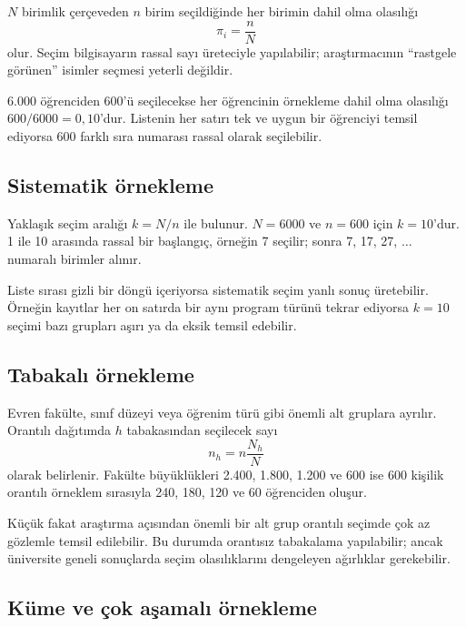 $N$ birimlik çerçeveden $n$ birim seçildiğinde her birimin dahil olma
olasılığı
\[
\pi_i=\frac{n}{N}
\]
olur. Seçim bilgisayarın rassal sayı üreteciyle yapılabilir; araştırmacının
``rastgele görünen'' isimler seçmesi yeterli değildir.

\begin{ornek}
6.000 öğrenciden 600'ü seçilecekse her öğrencinin örnekleme dahil olma
olasılığı $600/6000=0{,}10$'dur. Listenin her satırı tek ve uygun bir öğrenciyi
temsil ediyorsa 600 farklı sıra numarası rassal olarak seçilebilir.
\end{ornek}

\subsection{Sistematik örnekleme}

Yaklaşık seçim aralığı $k=N/n$ ile bulunur. $N=6000$ ve $n=600$ için
$k=10$'dur. 1 ile 10 arasında rassal bir başlangıç, örneğin 7 seçilir; sonra
7, 17, 27, $\ldots$ numaralı birimler alınır.

Liste sırası gizli bir döngü içeriyorsa sistematik seçim yanlı sonuç
üretebilir. Örneğin kayıtlar her on satırda bir aynı program türünü tekrar
ediyorsa $k=10$ seçimi bazı grupları aşırı ya da eksik temsil edebilir.

\subsection{Tabakalı örnekleme}

Evren fakülte, sınıf düzeyi veya öğrenim türü gibi önemli alt gruplara
ayrılır. Orantılı dağıtımda $h$ tabakasından seçilecek sayı
\[
n_h=n\frac{N_h}{N}
\]
olarak belirlenir. Fakülte büyüklükleri 2.400, 1.800, 1.200 ve 600 ise
600 kişilik orantılı örneklem sırasıyla 240, 180, 120 ve 60 öğrenciden oluşur.

Küçük fakat araştırma açısından önemli bir alt grup orantılı seçimde çok az
gözlemle temsil edilebilir. Bu durumda orantısız tabakalama yapılabilir; ancak
üniversite geneli sonuçlarda seçim olasılıklarını dengeleyen ağırlıklar
gerekebilir.

\subsection{Küme ve çok aşamalı örnekleme}

